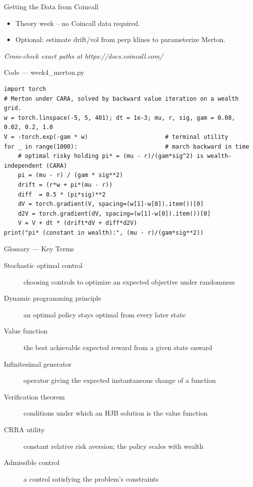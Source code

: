\documentclass[aspectratio=169,10pt]{beamer}
\begin{document}
\begin{frame}{Getting the Data from Coincall}
\begin{itemize}
  \item Theory week -- no Coincall data required.
  \item Optional: estimate drift/vol from perp klines to parameterize Merton.
\end{itemize}
\vspace{2pt}\tiny\textit{Cross-check exact paths at https://docs.coincall.com/}
\end{frame}

\begin{frame}[fragile]{Code --- week4\_merton.py}
\begin{lstlisting}
import torch
# Merton under CARA, solved by backward value iteration on a wealth grid.
w = torch.linspace(-5, 5, 401); dt = 1e-3; mu, r, sig, gam = 0.08, 0.02, 0.2, 1.0
V = -torch.exp(-gam * w)                      # terminal utility
for _ in range(1000):                         # march backward in time
    # optimal risky holding pi* = (mu - r)/(gam*sig^2) is wealth-independent (CARA)
    pi = (mu - r) / (gam * sig**2)
    drift = (r*w + pi*(mu - r))
    diff  = 0.5 * (pi*sig)**2
    dV = torch.gradient(V, spacing=(w[1]-w[0]).item())[0]
    d2V = torch.gradient(dV, spacing=(w[1]-w[0]).item())[0]
    V = V + dt * (drift*dV + diff*d2V)
print("pi* (constant in wealth):", (mu - r)/(gam*sig**2))
\end{lstlisting}
\end{frame}
\begin{frame}{Glossary --- Key Terms}
\footnotesize\begin{description}
\item[\color{ncsured}Stochastic optimal control] choosing controls to optimize an expected objective under randomness
\item[\color{ncsured}Dynamic programming principle] an optimal policy stays optimal from every later state
\item[\color{ncsured}Value function] the best achievable expected reward from a given state onward
\item[\color{ncsured}Infinitesimal generator] operator giving the expected instantaneous change of a function
\item[\color{ncsured}Verification theorem] conditions under which an HJB solution is the value function
\item[\color{ncsured}CRRA utility] constant relative risk aversion; the policy scales with wealth
\item[\color{ncsured}Admissible control] a control satisfying the problem's constraints
\end{description}
\end{frame}
\end{document}
